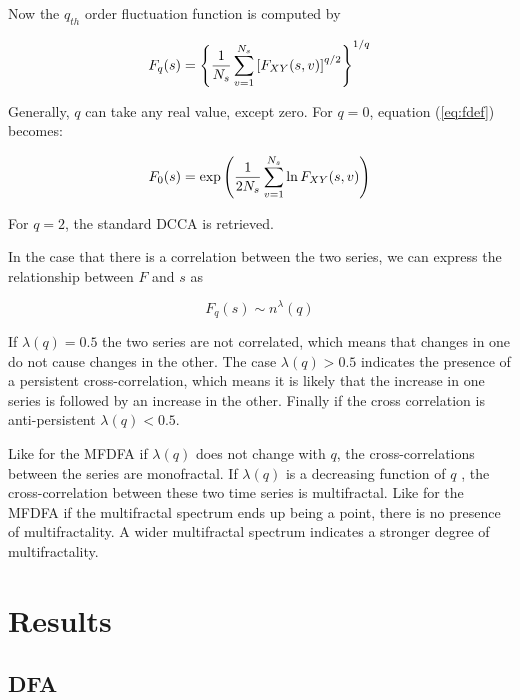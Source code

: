 \documentclass[onecolumn, preprint,aps,amsmath, amssymb, superscriptaddress]{revtex4}
\begin{document}
Now the $q_{th}$ order fluctuation function is computed by

\begin{equation}
F_q(s) =\left\{ {1 \over  N_s} \sum_{v=1}^{ N_s} \left[ F_{XY}(s,v)
\right]^{q/2} \right\}^{1/q} \label{eq:fdef}
\end{equation}

Generally, $q$ can take any real value, except zero. For $q=0$, equation (\ref{eq:fdef}) becomes:

\begin{equation}
F_0(s)= \exp\left( {1 \over  2N_s} \sum_{v=1}^{ N_s}\ln F_{XY}(s,v)\right
) \label{eq:fdef0}
\end{equation}

For $q=2$, the standard DCCA is retrieved.

In the case that there is a correlation between the two series, we can express the relationship between $F$ and $s$ as

\begin{equation}
F_q(s) \sim n^\lambda(q)
\end{equation}

If $\lambda(q)=0.5$ the two series are not correlated, which means that changes in one do not cause changes in the other. The case $\lambda(q) > 0.5$ indicates the presence of a persistent cross-correlation, which means it is likely that the increase in one series is followed by an increase in the other. Finally if the cross correlation is anti-persistent $\lambda(q) < 0.5$.

Like for the MFDFA if $\lambda(q)$ does not change with $q$, the cross-correlations between the series are monofractal. If $\lambda(q)$ is a decreasing function of $q$ , the cross-correlation between these two time series is multifractal. Like for the MFDFA if the multifractal spectrum ends up being a point, there is no presence of multifractality. A wider multifractal spectrum indicates a stronger degree of multifractality.



\section{Results}
\label{resultados}

\subsection{DFA}
\label{results_dfa}
\end{document}
